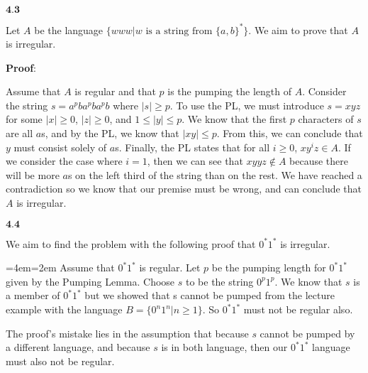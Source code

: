 \documentclass{article}
\newcommand{\problem}[1]{$\boxed{\textbf{#1}}$}
\newenvironment{blockquote}{%
  \par%
  \medskip
  \leftskip=4em\rightskip=2em%
  \noindent\ignorespaces}{%
  \par\medskip}
\begin{document}
\begin{minipage}{\textwidth}
\problem{4.3}

Let $A$ be the language $\{www|\text{$w$ is a string from $\{a,b\}^*$}\}$. We aim to prove that $A$ is irregular.

\textbf{Proof}:

Assume that $A$ is regular and that $p$ is the pumping the length of
$A$. Consider the string $s=a^pba^pba^pb$ where $|s|\ge{}p$. To use
the PL, we must introduce $s=xyz$ for some $|x|\ge0$, $|z|\ge0$, and
$1\le|y|\le{}p$. We know that the first $p$ characters of $s$ are all
$a$s, and by the PL, we know that $|xy|\le{}p$. From this, we can
conclude that $y$ must consist solely of $a$s. Finally, the PL states
that for all $i\ge0$, $xy^iz\in{}A$. If we consider the case where
$i=1$, then we can see that $xyyz\not\in{}A$ because there will be
more $a$s on the left third of the string than on the rest. We have
reached a contradiction so we know that our premise must be wrong, and
can conclude that $A$ is irregular.


\end{minipage}

\begin{minipage}{\textwidth}
\problem{4.4}

We aim to find the problem with the following proof that $0^*1^*$ is
irregular.

\begin{blockquote}
  Assume that $0^*1^*$ is regular.  Let $p$ be the pumping length for
  $0^*1^*$ given by the Pumping Lemma. Choose $s$ to be the string
  $0^p1^p$.  We know that $s$ is a member of $0^*1^*$ but we showed
  that s cannot be pumped from the lecture example with the language
  $B=\{0^n1^n|n\ge1\}$. So $0^*1^*$ must not be regular also.
\end{blockquote}

The proof's mistake lies in the assumption that because $s$ cannot be
pumped by a different language, and because $s$ is in both language,
then our $0^*1^*$ language must also not be regular.

\end{minipage}
\end{document}
